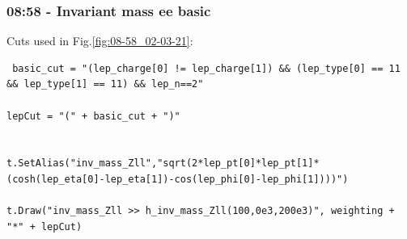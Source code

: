 \subsubsection*{08:58 - Invariant mass ee basic}
Cuts used in Fig.\ref{fig:08-58_02-03-21}:
\begin{lstlisting}
 basic_cut = "(lep_charge[0] != lep_charge[1]) && (lep_type[0] == 11 && lep_type[1] == 11) && lep_n==2"

lepCut = "(" + basic_cut + ")"

    
t.SetAlias("inv_mass_Zll","sqrt(2*lep_pt[0]*lep_pt[1]*(cosh(lep_eta[0]-lep_eta[1])-cos(lep_phi[0]-lep_phi[1])))")
  
t.Draw("inv_mass_Zll >> h_inv_mass_Zll(100,0e3,200e3)", weighting + "*" + lepCut)
\end{lstlisting}

